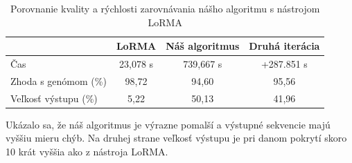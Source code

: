 \begin{table}
    \centering
    \begin{tabular}{ | l || c | c | c | }
    \hline 
& LoRMA & Náš algoritmus & Druhá iterácia \\ \hline \hline
Čas & 23,078 s & 739,667 s & +287.851 s \\ \hline
Zhoda s genómom (\%) & 98,72 & 94,60 & 95,56 \\ \hline
Veľkosť výstupu (\%) & 5,22 & 50,13 & 41,96 \\ \hline
    \end{tabular}
    \caption{Porovnanie kvality a rýchlosti zarovnávania nášho algoritmu s nástrojom LoRMA}
    \label{porovnanie_s_lormou}
\end{table}

Ukázalo sa, že náš algoritmus je výrazne pomalší a výstupné sekvencie majú vyššiu mieru chýb. Na druhej strane veľkosť výstupu je pri danom pokrytí skoro 10 krát vyššia ako z nástroja LoRMA.